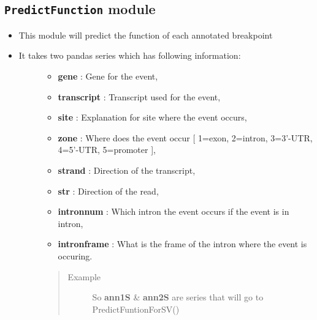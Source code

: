 \documentclass[letterpaper,10pt,english]{sphinxmanual}
\begin{document}
\subsection{\texttt{PredictFunction} module}
\label{iAnnotateSV:predictfunction-module}\begin{itemize}
\item {} 
This module will predict the function of each annotated breakpoint

\item {} \begin{description}
\item[{It takes two pandas series which has following information:}] \leavevmode\begin{itemize}
\item {} 
\textbf{gene} : Gene for the event,

\item {} 
\textbf{transcript} : Transcript used for the event,

\item {} 
\textbf{site} : Explanation for site where the event occurs,

\item {} 
\textbf{zone} : Where does the event occur {[} 1=exon, 2=intron, 3=3'-UTR, 4=5'-UTR, 5=promoter {]},

\item {} 
\textbf{strand} : Direction of the transcript,

\item {} 
\textbf{str} : Direction of the read,

\item {} 
\textbf{intronnum} : Which intron the event occurs if the event is in intron,

\item {} 
\textbf{intronframe} : What is the frame of the intron where the event is occuring.

\end{itemize}
\begin{quote}\begin{description}
\item[{Example}] \leavevmode
{}


So \textbf{ann1S} \& \textbf{ann2S} are series that will go to PredictFuntionForSV()


\end{description}\end{quote}

\end{description}

\end{itemize}
\end{document}
